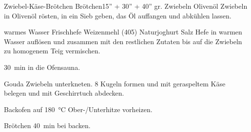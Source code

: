 \begin{MyRecipe}{Zwiebel-Käse-Brötchen}{ Brötchen}{15'' + 30'' + 40''}
	\ingredient[\Calc{2}{\x}]{} {gr. Zwiebeln}
	\ingredient[\Calc{25}{\x}]{\si{\gram}} {Olivenöl}
	Zwiebeln in Olivenöl rösten, in ein Sieb geben, das Öl auffangen und abkühlen lassen.\par\bigskip

	\ingredient[\Calc{0.1}{\x}]{\si{\liter}} {warmes Wasser}
	 {Frischhefe}
	\ingredient[\Calc{0.3}{\x}]{\si{\kilogram}} {Weizenmehl (405)}
	\ingredient[\Calc{0.13}{\x}]{\si{\kilogram}} {Naturjoghurt}
	 {Salz}
	Hefe in warmen Wasser auflösen und zusammen mit den restlichen Zutaten bis auf die Zwiebeln zu homogenem Teig vermischen.
	
	\SI{30}{\minute} in die Ofensauna.\par\bigskip
	
	
	\ingredient[\Calc{0.1}{\x}]{\si{\kilogram}} {Gouda}
	Zwiebeln unterkneten. 8 Kugeln formen und mit geraspeltem Käse belegen und mit Geschirrtuch abdecken.
	
	Backofen auf \SI{180}{\degreeCelsius} Ober-/Unterhitze vorheizen.
	
	Brötchen \SI{40}{\minute} bei  backen.
	
	
	
\end{MyRecipe}